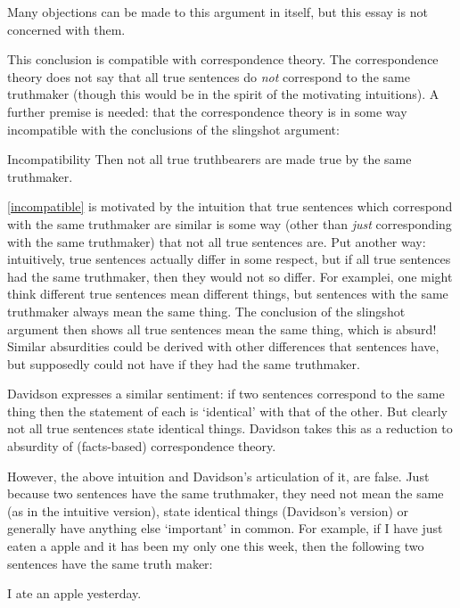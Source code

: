 Many objections can be made to this argument in itself, but this essay is not concerned with them.

This conclusion is compatible with correspondence theory.
The correspondence theory does not say that all true sentences do \emph{not} correspond to the same truthmaker (though this would be in the spirit of the motivating intuitions).
A further premise is needed: that the correspondence theory is in some way incompatible with the conclusions of the slingshot argument:

	\begin{principle}{Incompatibility} \label{incompatible}
	Then not all true truthbearers are made true by the same truthmaker.
	\end{principle}

\ref{incompatible} is motivated by the intuition that true sentences which correspond with the same truthmaker are similar is some way (other than \emph{just} corresponding with the same truthmaker) that not all true sentences are.
Put another way: intuitively, true sentences actually differ in some respect, but if all true sentences had the same truthmaker, then they would not so differ.
For examplei, one might think different true sentences mean different things, but sentences with the same truthmaker always mean the same thing.
The conclusion of the slingshot argument then shows all true sentences mean the same thing, which is absurd!
Similar absurdities could be derived with other differences that sentences have, but supposedly could not have if they had the same truthmaker.

Davidson expresses a similar sentiment: if two sentences correspond to the same thing then the statement of each is `identical' with that of the other.
But clearly not all true sentences state identical things.
Davidson takes this as a reduction to absurdity of (facts-based) correspondence theory. %
\parencite[750]{Davidson_1969}

However, the above intuition and Davidson's articulation of it, are false.
Just because two sentences have the same truthmaker, they need not mean the same (as in the intuitive version), state identical things (Davidson's version) or generally have anything else `important' in common.
For example, if I have just eaten a apple and it has been my only one this week, then the following two sentences have the same truth maker:

	\begin{example} \label{yesterday}
	I ate an apple yesterday.
	\end{example}

